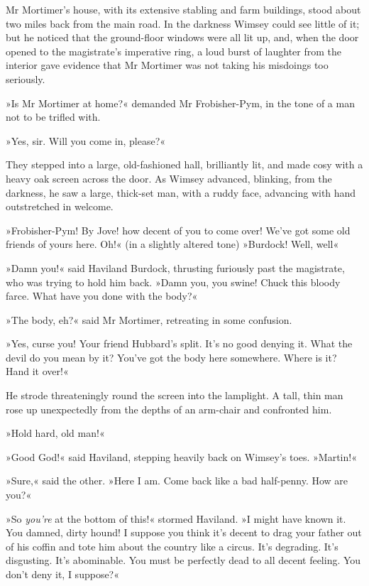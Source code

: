 Mr Mortimer's house, with its extensive stabling and farm buildings, stood about two miles back from the main road. In the darkness Wimsey could see little of it; but he noticed that the ground-floor windows were all lit up, and, when the door opened to the magistrate's imperative ring, a loud burst of laughter from the interior gave evidence that Mr Mortimer was not taking his misdoings too seriously.

»Is Mr Mortimer at home?« demanded Mr Frobisher-Pym, in the tone of a man not to be trifled with.

»Yes, sir. Will you come in, please?«

They stepped into a large, old-fashioned hall, brilliantly lit, and made cosy with a heavy oak screen across the door. As Wimsey advanced, blinking, from the darkness, he saw a large, thick-set man, with a ruddy face, advancing with hand outstretched in welcome.

»Frobisher-Pym! By Jove! how decent of you to come over! We've got some old friends of yours here. Oh!« (in a slightly altered tone) »Burdock! Well, well\longdash«

»Damn you!« said Haviland Burdock, thrusting furiously past the magistrate, who was trying to hold him back. »Damn you, you swine! Chuck this bloody farce. What have you done with the body?«

»The body, eh?« said Mr Mortimer, retreating in some confusion.

»Yes, curse you! Your friend Hubbard's split. It's no good denying it. What the devil do you mean by it? You've got the body here somewhere. Where is it? Hand it over!«

He strode threateningly round the screen into the lamplight. A tall, thin man rose up unexpectedly from the depths of an arm-chair and confronted him.

»Hold hard, old man!«

»Good God!« said Haviland, stepping heavily back on Wimsey's toes. »Martin!«

»Sure,« said the other. »Here I am. Come back like a bad half-penny. How are you?«

»So \textit{you're} at the bottom of this!« stormed Haviland. »I might have known it. You damned, dirty hound! I suppose you think it's decent to drag your father out of his coffin and tote him about the country like a circus. It's degrading. It's disgusting. It's abominable. You must be perfectly dead to all decent feeling. You don't deny it, I suppose?«

